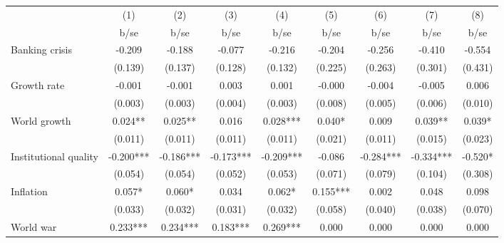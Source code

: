 \begin{tabular}{l*{8}{c}}
                                &\multicolumn{1}{c}{(1)}   &\multicolumn{1}{c}{(2)}   &\multicolumn{1}{c}{(3)}   &\multicolumn{1}{c}{(4)}   &\multicolumn{1}{c}{(5)}   &\multicolumn{1}{c}{(6)}   &\multicolumn{1}{c}{(7)}   &\multicolumn{1}{c}{(8)}   \\
                                &        b/se   &        b/se   &        b/se   &        b/se   &        b/se   &        b/se   &        b/se   &        b/se   \\
\hline
Banking crisis                  &      -0.209   &      -0.188   &      -0.077   &      -0.216   &      -0.204   &      -0.256   &      -0.410   &      -0.554   \\
                                &     (0.139)   &     (0.137)   &     (0.128)   &     (0.132)   &     (0.225)   &     (0.263)   &     (0.301)   &     (0.431)   \\
Growth rate                     &      -0.001   &      -0.001   &       0.003   &       0.001   &      -0.000   &      -0.004   &      -0.005   &       0.006   \\
                                &     (0.003)   &     (0.003)   &     (0.004)   &     (0.003)   &     (0.008)   &     (0.005)   &     (0.006)   &     (0.010)   \\
World growth                    &       0.024** &       0.025** &       0.016   &       0.028***&       0.040*  &       0.009   &       0.039** &       0.039*  \\
                                &     (0.011)   &     (0.011)   &     (0.011)   &     (0.011)   &     (0.021)   &     (0.011)   &     (0.015)   &     (0.023)   \\
Institutional quality           &      -0.200***&      -0.186***&      -0.173***&      -0.209***&      -0.086   &      -0.284***&      -0.334***&      -0.520*  \\
                                &     (0.054)   &     (0.054)   &     (0.052)   &     (0.053)   &     (0.071)   &     (0.079)   &     (0.104)   &     (0.308)   \\
Inflation                       &       0.057*  &       0.060*  &       0.034   &       0.062*  &       0.155***&       0.002   &       0.048   &       0.098   \\
                                &     (0.033)   &     (0.032)   &     (0.031)   &     (0.032)   &     (0.058)   &     (0.040)   &     (0.038)   &     (0.070)   \\
World war                       &       0.233***&       0.234***&       0.183***&       0.269***&       0.000   &       0.000   &       0.000   &       0.000   \\

\end{tabular}
